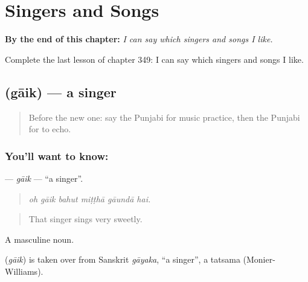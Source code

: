 
\chapter{Singers and Songs}
\label{ch:pa-a2-singers-and-songs}

\begin{chapteropening}
\textbf{By the end of this chapter:} \emph{I can say which singers and songs I like.}

Complete the last lesson of chapter 349: I can say which singers and songs I like.
\end{chapteropening}

\section[\texorpdfstring{\pa{ਗਾਇਕ} (gāik)}{ਗਾਇਕ (gāik)}]{ (gāik) — a singer}

\label{lesson:PA-C349-gaik}



\begin{quote}
Before the new one: say the Punjabi for music practice, then the Punjabi for to echo.
\end{quote}

\subsection*{You'll want to know: }
\textbf{} — \emph{gāik} — \textquotedblleft{}a singer\textquotedblright{}.

\begin{quote}
     
\end{quote}

\begin{quote}
\emph{oh gāik bahut miṭṭhā gāundā hai.}
\end{quote}

\begin{quote}
That singer sings very sweetly.
\end{quote}

A masculine noun.

\begin{cousinweb}
\textbf{} (\emph{gāik}) is taken over from Sanskrit \emph{gāyaka}, \textquotedblleft{}a singer\textquotedblright{}, a tatsama (Monier-Williams).
\end{cousinweb}

